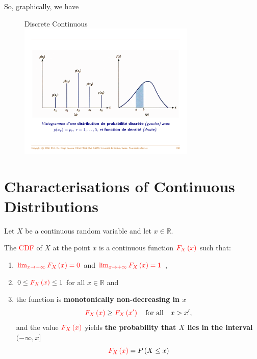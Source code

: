 \documentclass[notes=show,smaller]{beamer}\usepackage[]{graphicx}\usepackage[]{color}
\renewcommand{\Pr}{P}
\begin{document}
\begin{frame}{\secname}
  So, graphically, we have \\ \bigskip
  \begin{figure}
  \hspace{1cm} Discrete \hspace{3cm} Continuous\\
  \includegraphics[width=0.75\textwidth,height=0.5\textheight]{img/discr_vs_cont.pdf}
  \end{figure}
\end{frame}%

\section{Characterisations of Continuous Distributions}

\begin{frame}{\secname}
  \begin{definition}
  Let $X$ be a continuous random variable and let $x\in \mathbb{R}$.
  \medskip

  The \textcolor{red}{CDF} of $X$ at the point $x$ is a continuous function
  $\color{red}{F_{X}\left( x\right)}$ such that:
  \begin{enumerate}
  \item $\color{red}{\lim_{x\rightarrow -\infty}F_{X}\left(x\right)}=0$ and $\color{red}{\lim_{x\rightarrow +\infty}F_{X}\left(x\right)}=1$ ,\medskip
  \item $0\leq \color{red}F_{X}\left( x\right)\color{black} \leq 1$ for all $x\in \mathbb{R}$ and\medskip
  \item the function is \textbf{monotonically non-decreasing in $x$}
  $$\color{red} F_{X}\left( x\right)\color{black}\geq \color{red}F_{X}\left( x'\right)\color{black}\quad\mbox{for all}\quad x>x',
  $$and the value $\color{red}F_{X}\left( x\right)\color{black} $ yields \textbf{the probability that $X$ lies in the interval $(-\infty,x]$}
  $$\color{red}F_{X}\left( x\right) \color{black} = \Pr \left( X\leq x\right)$$
  \end{enumerate}
  \end{definition}
\end{frame}
\end{document}
